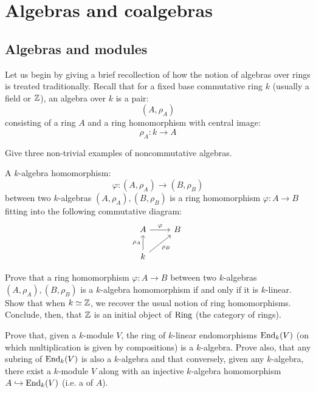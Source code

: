 \section{Algebras and coalgebras}
    \subsection{Algebras and modules}
        Let us begin by giving a brief recollection of how the notion of algebras over rings is treated traditionally. Recall that for a fixed base commutative ring $k$ (usually a field or $\mathbb{Z}$), an algebra over $k$ is a pair:
            $$(A, \rho_A)$$
        consisting of a ring $A$ and a ring homomorphism with central image:
            $$\rho_A: k \to A$$
        \begin{question}
            Give three non-trivial examples of noncommutative algebras.
        \end{question}
        A $k$-algebra homomorphism:
            $$\varphi: (A, \rho_A) \to (B, \rho_B)$$
        between two $k$-algebras $(A, \rho_A), (B, \rho_B)$ is a ring homomorphism $\varphi: A \to B$ fitting into the following commutative diagram:
            $$
                \begin{tikzcd}
            	A & B \\
            	k
            	\arrow["\varphi", from=1-1, to=1-2]
            	\arrow["{\rho_A}", from=2-1, to=1-1]
            	\arrow["{\rho_B}"', from=2-1, to=1-2]
                \end{tikzcd}
            $$
        \begin{question}
            Prove that a ring homomorphism $\varphi: A \to B$ between two $k$-algebras $(A, \rho_A), (B, \rho_B)$ is a $k$-algebra homomorphism if and only if it is $k$-linear. Show that when $k \simeq \mathbb{Z}$, we recover the usual notion of ring homomorphisms. Conclude, then, that $\mathbb{Z}$ is an initial object of $\mathrm{Ring}$ (the category of rings).
        \end{question}
        \begin{question}
            Prove that, given a $k$-module $V$, the ring of $k$-linear endomorphisms $\mathrm{End}_k(V)$ (on which multiplication is given by compositions) is a $k$-algebra. Prove also, that any subring of $\mathrm{End}_k(V)$ is also a $k$-algebra and that conversely, given any $k$-algebra, there exist a $k$-module $V$ along with an injective $k$-algebra homomorphism $A \hookrightarrow \mathrm{End}_k(V)$ (i.e. a  of $A$). 
        \end{question}

